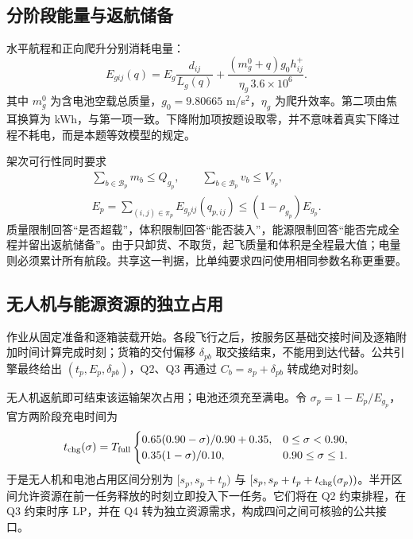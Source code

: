 \subsection{分阶段能量与返航储备}
水平航程和正向爬升分别消耗电量：
\begin{equation}
E_{gij}(q)=E_g\frac{d_{ij}}{L_g(q)}+
\frac{(m_g^0+q)g_0h^+_{ij}}{\eta_g\,3.6\times10^6}.\label{eq:energy}
\end{equation}
其中 $m_g^0$ 为含电池空载总质量，$g_0=9.80665$ m/s$^2$，$\eta_g$ 为爬升效率。第二项由焦耳换算为 kWh，与第一项一致。下降附加项按题设取零，并不意味着真实下降过程不耗电，而是本题等效模型的规定。

架次可行性同时要求
\begin{equation}
\begin{gathered}
\sum_{b\in\mathcal B_p}m_b\le Q_{g_p},\qquad
\sum_{b\in\mathcal B_p}v_b\le V_{g_p},\\
E_p=\sum_{(i,j)\in\pi_p}E_{g_pij}(q_{p,ij})
\le(1-\rho_{g_p})E_{g_p}.\label{eq:feasible}
\end{gathered}
\end{equation}
质量限制回答“是否超载”，体积限制回答“能否装入”，能源限制回答“能否完成全程并留出返航储备”。由于只卸货、不取货，起飞质量和体积是全程最大值；电量则必须累计所有航段。共享这一判据，比单纯要求四问使用相同参数名称更重要。

\subsection{无人机与能源资源的独立占用}
作业从固定准备和逐箱装载开始。各段飞行之后，按服务区基础交接时间及逐箱附加时间计算完成时刻；货箱的交付偏移 $\delta_{pb}$ 取交接结束，不能用到达代替。公共引擎最终给出 $(t_p,E_p,\delta_{pb})$，Q2、Q3 再通过 $C_b=s_p+\delta_{pb}$ 转成绝对时刻。

无人机返航即可结束该运输架次占用；电池还须充至满电。令 $\sigma_p=1-E_p/E_{g_p}$，官方两阶段充电时间为
\begin{equation}
 t_{\rm chg}(\sigma)=T_{\rm full}
 \begin{cases}
 0.65(0.90-\sigma)/0.90+0.35,&0\le\sigma<0.90,\\
 0.35(1-\sigma)/0.10,&0.90\le\sigma\le1.
 \end{cases}\label{eq:charge}
\end{equation}
于是无人机和电池占用区间分别为 $[s_p,s_p+t_p)$ 与 $[s_p,s_p+t_p+t_{\rm chg}(\sigma_p))$。半开区间允许资源在前一任务释放的时刻立即投入下一任务。它们将在 Q2 约束排程，在 Q3 约束时序 LP，并在 Q4 转为独立资源需求，构成四问之间可核验的公共接口。
\FloatBarrier
